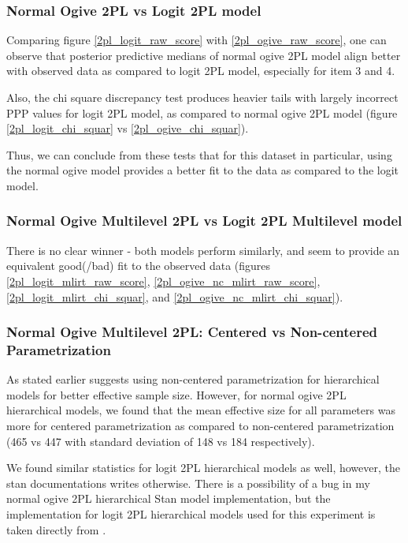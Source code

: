 \documentclass[12pt]{article}
\begin{document}
\subsubsection{Normal Ogive 2PL vs Logit 2PL model}
Comparing figure \ref{2pl_logit_raw_score} with \ref{2pl_ogive_raw_score}, one can observe that posterior predictive medians of normal ogive 2PL model align better with observed data as compared to logit 2PL model, especially for item 3 and 4.

Also, the chi square discrepancy test produces heavier tails with largely incorrect PPP values for logit 2PL model, as compared to normal ogive 2PL model (figure \ref{2pl_logit_chi_squar} vs \ref{2pl_ogive_chi_squar}).

Thus, we can conclude from these tests that for this dataset in particular, using the normal ogive model provides a better fit to the data as compared to the logit model.

\subsubsection{Normal Ogive Multilevel 2PL vs Logit 2PL Multilevel model}
There is no clear winner - both models perform similarly, and seem to provide an equivalent good(/bad) fit to the observed data (figures \ref{2pl_logit_mlirt_raw_score}, \ref{2pl_ogive_nc_mlirt_raw_score}, \ref{2pl_logit_mlirt_chi_squar}, and \ref{2pl_ogive_nc_mlirt_chi_squar}).

\subsubsection{Normal Ogive Multilevel 2PL: Centered vs Non-centered Parametrization}

As stated earlier \cite{furr2016two} suggests using non-centered parametrization for hierarchical models for better effective sample size. However, for normal ogive 2PL hierarchical models, we found that the mean effective size for all parameters was more for centered parametrization as compared to non-centered parametrization (465 vs 447 with standard deviation of 148 vs 184 respectively).

We found similar statistics for logit 2PL hierarchical models as well, however, the stan documentations \cite{furr2016two} writes otherwise. There is a possibility of a bug in my normal ogive 2PL hierarchical Stan model implementation, but the implementation for logit 2PL hierarchical models used for this experiment is taken directly from \cite{furr2016two}.
\end{document}

